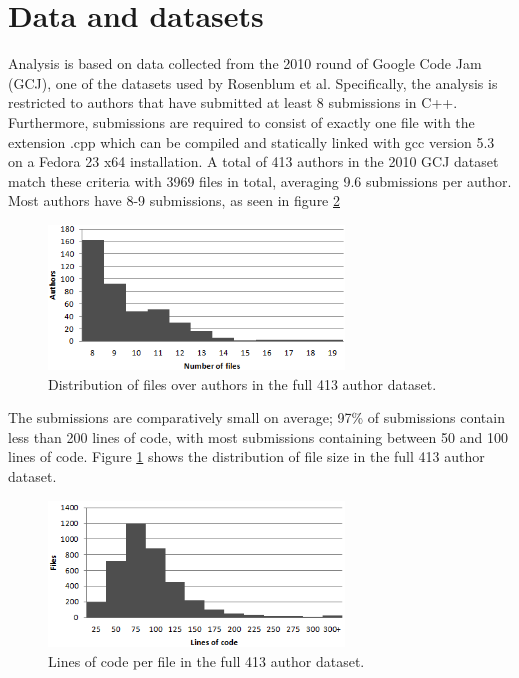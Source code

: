 \documentclass[a4paper,11pt]{kth-mag}
\begin{document}
\section{Data and datasets} \label{sec:data-datasets}
Analysis is based on data collected from the 2010 round of Google Code Jam
(GCJ), one of the datasets used by Rosenblum et al. Specifically, the analysis
is restricted to authors that have submitted at least 8 submissions in C++.
Furthermore, submissions are required to consist of exactly one file with the
extension .cpp which can be compiled and statically linked with gcc version 5.3
on a Fedora 23 x64 installation. A total of 413 authors in the 2010 GCJ dataset
match these criteria with 3969 files in total, averaging 9.6 submissions per
author. Most authors have 8-9 submissions, as seen in figure \ref{fig:files} 

\begin{figure}[!htb]
    \centering
    \includegraphics[width=0.7\textwidth]{loc}
    \caption{Distribution of files over authors in the full 413 author
    dataset.}
    \label{fig:loc}
\end{figure}

The submissions are comparatively small on average; 97\% of submissions contain
less than 200 lines of code, with most submissions containing between 50 and
100 lines of code. Figure \ref{fig:loc} shows the distribution of file size
in the full 413 author dataset. 

\begin{figure}[!htb]
    \centering
    \includegraphics[width=0.7\textwidth]{files}
    \caption{Lines of code per file in the full 413 author dataset.}
    \label{fig:files}
\end{figure}
\end{document}

